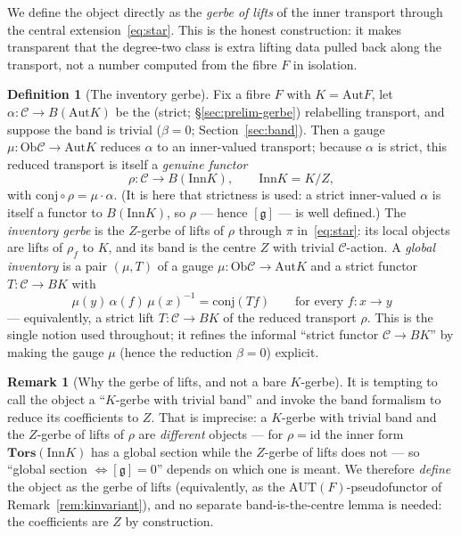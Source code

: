 \documentclass[11pt]{article}
\theoremstyle{definition}
\newtheorem{definition}[theorem]{Definition}
\newtheorem{remark}[theorem]{Remark}
\newcommand{\C}{\mathcal{C}}
\newcommand{\Ob}{\mathrm{Ob}}
\newcommand{\id}{\mathrm{id}}
\newcommand{\Aut}{\mathrm{Aut}}
\newcommand{\Inn}{\mathrm{Inn}}
\newcommand{\Zc}{Z}
\newcommand{\gerbe}{\mathfrak{g}}
\begin{document}
We define the object directly as the \emph{gerbe of lifts} of the inner transport through the
central extension~\eqref{eq:star}. This is the honest construction: it makes transparent that the
degree-two class is extra lifting data pulled back along the transport, not a number computed from
the fibre $F$ in isolation.

\begin{definition}[The inventory gerbe]\label{def:gerbe}
Fix a fibre $F$ with $K=\Aut F$, let $\alpha:\C\to B(\Aut K)$ be the (strict; \S\ref{sec:prelim-gerbe})
relabelling transport, and suppose the band is trivial ($\beta=0$; Section~\ref{sec:band}). Then a
gauge $\mu:\Ob\C\to\Aut K$ reduces $\alpha$ to an inner-valued transport; because $\alpha$ is strict,
this reduced transport is itself a \emph{genuine functor}
\[
\rho:\C\longrightarrow B(\Inn K),\qquad \Inn K=K/\Zc,
\]
with $\mathrm{conj}\circ\rho=\mu\cdot\alpha$. (It is here that strictness is used: a strict
inner-valued $\alpha$ is itself a functor to $B(\Inn K)$, so $\rho$ --- hence $[\gerbe]$ --- is well
defined.) The \emph{inventory gerbe} is the $\Zc$-gerbe of lifts
of $\rho$ through $\pi$ in~\eqref{eq:star}: its local objects are lifts of $\rho_f$ to $K$, and its
band is the centre $\Zc$ with trivial $\C$-action. A \emph{global inventory} is a pair $(\mu,T)$ of
a gauge $\mu:\Ob\C\to\Aut K$ and a strict functor $T:\C\to BK$ with
\begin{equation}\label{eq:D2}
\mu(y)\,\alpha(f)\,\mu(x)^{-1}=\mathrm{conj}(T f)\qquad\text{for every } f:x\to y
\tag{D2}
\end{equation}
--- equivalently, a strict lift $T:\C\to BK$ of the reduced transport $\rho$. This is the single
notion used throughout; it refines the informal ``strict functor $\C\to BK$'' by making the gauge
$\mu$ (hence the reduction $\beta=0$) explicit.
\end{definition}

\begin{remark}[Why the gerbe of lifts, and not a bare $K$-gerbe]\label{rem:lifts}
It is tempting to call the object a ``$K$-gerbe with trivial band'' and invoke the band formalism
to reduce its coefficients to $\Zc$. That is imprecise: a $K$-gerbe with trivial band and the
$\Zc$-gerbe of lifts of $\rho$ are \emph{different} objects --- for $\rho=\id$ the inner form
$\mathbf{Tors}(\Inn K)$ has a global section while the $\Zc$-gerbe of lifts does not --- so
``global section $\Leftrightarrow[\gerbe]=0$'' depends on which one is meant. We therefore
\emph{define} the object as the gerbe of lifts (equivalently, as the $\mathrm{AUT}(F)$-pseudofunctor
of Remark~\ref{rem:kinvariant}), and no separate band-is-the-centre lemma is needed: the
coefficients are $\Zc$ by construction.
\end{remark}
\end{document}
